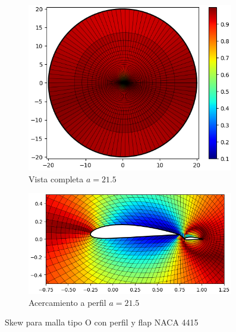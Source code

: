 \documentclass[letterpaper, openright, 12pt]{book}
\begin{document}
\begin{figure}[htbp!]
\begin{subfigure}[c]{0.48\textwidth}
            \includegraphics[keepaspectratio, width=0.99\textwidth]
                {./img/naca4415_flap_aa_215_skew_far}
            \caption{Vista completa $a=21.5$}
            \label{fig:naca4415_flap_aa_215_skew_far}
        \end{subfigure}
        \hfill
        \begin{subfigure}[c]{0.48\textwidth}
            \includegraphics[keepaspectratio, width=0.99\textwidth]
                {./img/naca4415_flap_aa_215_skew_close}
            \caption{Acercamiento a perfil $a=21.5$}
            \label{fig:naca4415_flap_aa_215_skew_close}
        \end{subfigure}
        \caption{Skew para malla tipo O con perfil y flap NACA 4415}
        \label{fig:naca4415_flap_skew_1}
    \end{figure}
\end{document}
